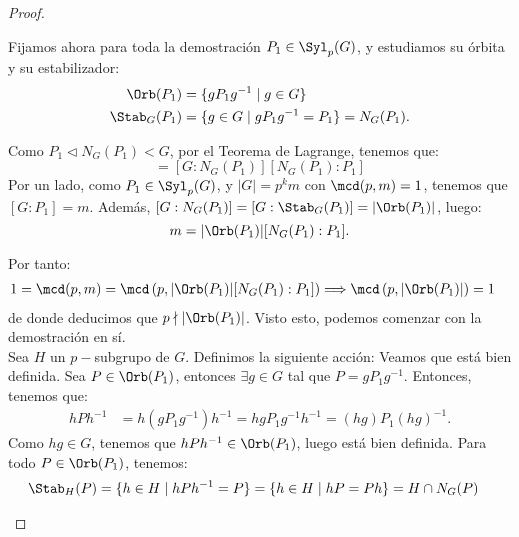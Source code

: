 \begin{ejercicio}
\begin{teo}
\begin{proof}
\begin{enumerate}
                Fijamos ahora para toda la demostración $P_1\in \Syl_p(G)$, y estudiamos su órbita y su estabilizador:
                \begin{align*}
                    \Orb(P_1) &= \{gP_1g^{-1}\mid g\in G\}\\
                    \Stab_{G}(P_1) &= \{g\in G\mid gP_1g^{-1} = P_1\} = N_G(P_1).
                \end{align*}

                Como $P_1\lhd N_G(P_1)<G$, por el Teorema de Lagrange, tenemos que:
                \begin{equation*}
                    [G:P_1] = [G:N_G(P_1)][N_G(P_1):P_1]
                \end{equation*}
                Por un lado, como $P_1\in \Syl_p(G)$, y $|G| = p^k m$ con \(\mcd(p, m) = 1\), tenemos que $[G:P_1] = m$. Además, $[G:N_G(P_1)]=[G:\Stab_{G}(P_1)]=|\Orb(P_1)|$, luego:
                \begin{equation}\label{eq:orbita}
                    m = |\Orb(P_1)|[N_G(P_1):P_1].
                \end{equation}

                Por tanto:
                \begin{align*}
                    1=\mcd(p, m) &= \mcd\left(p, |\Orb(P_1)|[N_G(P_1):P_1]\right)
                    \Longrightarrow
                    \mcd\left(p, |\Orb(P_1)|\right) = 1
                \end{align*}
                de donde deducimos que $p\nmid |\Orb(P_1)|$. Visto esto, podemos comenzar con la demostración en sí.\\

                Sea $H$ un \(p-\)subgrupo de \(G\). Definimos la siguiente acción:
                Veamos que está bien definida. Sea \(P\in \Orb(P_1)\), entonces $\exists g\in G$ tal que \(P = gP_1g^{-1}\). Entonces, tenemos que:
                \begin{align*}
                    hPh^{-1} &= h(gP_1g^{-1})h^{-1} = hgP_1g^{-1}h^{-1} = (hg)P_1(hg)^{-1}.
                \end{align*}
                Como \(hg\in G\), tenemos que \(hPh^{-1}\in \Orb(P_1)\), luego está bien definida. Para todo $P\in \Orb(P_1)$, tenemos:
                \begin{align*}
                    \Stab_{H}(P) &= \{h\in H\mid hPh^{-1} = P\} = \{h\in H\mid hP=Ph\} = H\cap N_G(P)
                \end{align*}


\end{enumerate}
\end{proof}
\end{teo}
\end{ejercicio}
